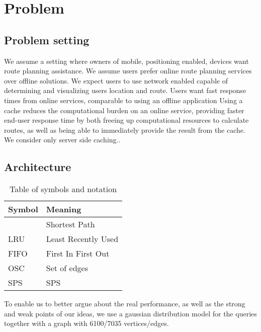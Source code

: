 \section{Problem}\label{sec:problemdef}

\subsection{Problem setting}\label{subsec:probset}
We assume a setting where owners of mobile, positioning enabled, devices want route planning assistance. We assume users prefer online route planning services over offline solutions. 
We expect users to use network enabled capable of determining and visualizing users location and route.
Users want fast response times from online services, comparable to using an offline application \cite{ref}
Using a cache reduces the computational burden \cite{ref} on an online service, providing faster end-user response time \cite{ref} by both freeing up computational resources to calculate \spath routes, as well as being able to immediately provide the \spath result from the cache.
We consider only server side caching..



\subsection{Architecture}

\begin{table}
\begin{tabular*}{\columnwidth}{|l||p{}|}
\hline
Symbol		& Meaning \\\hline
\spath		& Shortest Path \\\hline
LRU		& Least Recently Used \\\hline
FIFO		& First In First Out \\\hline
OSC		& Set of edges \\\hline
\acs{SPS} 	& \acl{SPS} \\\hline
\end{tabular*}
\caption{Table of symbols and notation} 
\label{tab:symbols}
\end{table}


To enable us to better argue about the real performance, as well as the strong and weak points of our ideas, we use a gaussian distribution model for the queries together with a graph with 6100/7035 vertices/edges.


